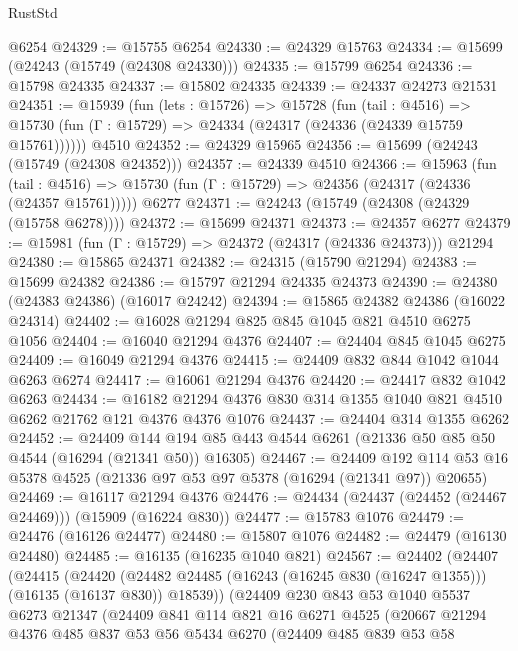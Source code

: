 \begin{lexlean}{RustStd}
\begin{coremodule}
    @6254
@24329 := @15755 @6254
@24330 := @24329 @15763
@24334 := @15699 (@24243 (@15749 (@24308 @24330)))
@24335 := @15799 @6254
@24336 := @15798 @24335
@24337 := @15802 @24335
@24339 := @24337 @24273 @21531
@24351 := @15939
    (fun (lets : @15726) =>
    @15728
      (fun (tail : @4516) =>
      @15730 (fun (Γ : @15729) => @24334 (@24317 (@24336 (@24339 @15759 @15761))))))
    @4510
@24352 := @24329 @15965
@24356 := @15699 (@24243 (@15749 (@24308 @24352)))
@24357 := @24339 @4510
@24366 := @15963
    (fun (tail : @4516) => @15730 (fun (Γ : @15729) => @24356 (@24317 (@24336 (@24357 @15761)))))
    @6277
@24371 := @24243 (@15749 (@24308 (@24329 (@15758 @6278))))
@24372 := @15699 @24371
@24373 := @24357 @6277
@24379 := @15981 (fun (Γ : @15729) => @24372 (@24317 (@24336 @24373))) @21294
@24380 := @15865 @24371
@24382 := @24315 (@15790 @21294)
@24383 := @15699 @24382
@24386 := @15797 @21294 @24335 @24373
@24390 := @24380 (@24383 @24386) (@16017 @24242)
@24394 := @15865 @24382 @24386 (@16022 @24314)
@24402 := @16028 @21294 @825 @845 @1045 @821 @4510 @6275 @1056
@24404 := @16040 @21294 @4376
@24407 := @24404 @845 @1045 @6275
@24409 := @16049 @21294 @4376
@24415 := @24409 @832 @844 @1042 @1044 @6263 @6274
@24417 := @16061 @21294 @4376
@24420 := @24417 @832 @1042 @6263
@24434 := @16182 @21294 @4376 @830 @314 @1355 @1040 @821 @4510 @6262 @21762 @121 @4376 @4376 @1076
@24437 := @24404 @314 @1355 @6262
@24452 := @24409
    @144
    @194
    @85
    @443
    @4544
    @6261
    (@21336 @50 @85 @50 @4544 (@16294 (@21341 @50)) @16305)
@24467 := @24409
    @192
    @114
    @53
    @16
    @5378
    @4525
    (@21336 @97 @53 @97 @5378 (@16294 (@21341 @97)) @20655)
@24469 := @16117 @21294 @4376
@24476 := @24434 (@24437 (@24452 (@24467 @24469))) (@15909 (@16224 @830))
@24477 := @15783 @1076
@24479 := @24476 (@16126 @24477)
@24480 := @15807 @1076
@24482 := @24479 (@16130 @24480)
@24485 := @16135 (@16235 @1040 @821)
@24567 := @24402
    (@24407
      (@24415
        (@24420 (@24482 @24485 (@16243 (@16245 @830 (@16247 @1355))) (@16135 (@16137 @830)) @18539))
        (@24409
          @230
          @843
          @53
          @1040
          @5537
          @6273
          @21347
          (@24409
            @841
            @114
            @821
            @16
            @6271
            @4525
            (@20667
              @21294
              @4376
              @485
              @837
              @53
              @56
              @5434
              @6270
              (@24409
                @485
                @839
                @53
                @58

\end{coremodule}
\end{lexlean}
